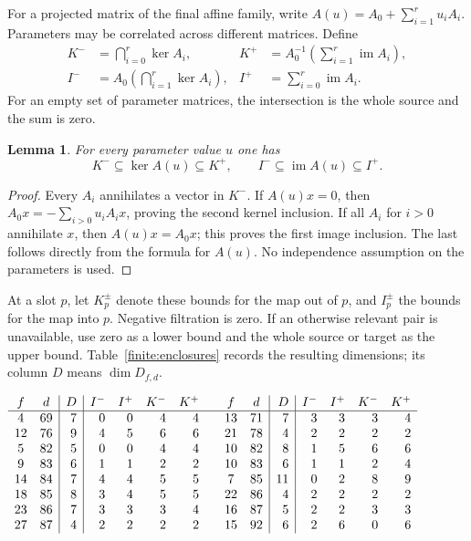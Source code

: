 \documentclass[11pt]{article}
\newtheorem{lemma}[theorem]{Lemma}
\theoremstyle{definition}
\theoremstyle{remark}
\numberwithin{equation}{section}
\begin{document}
For a projected matrix of the final affine family, write
$A(u)=A_0+\sum_{i=1}^r u_iA_i$.  Parameters may be correlated across
different matrices.  Define
\begin{align}
 K^-&=\bigcap_{i=0}^r\ker A_i,&
 K^+&=A_0^{-1}\left(\sum_{i=1}^r\operatorname{im} A_i\right),\label{finite:kernel-bounds}\\
 I^-&=A_0\left(\bigcap_{i=1}^r\ker A_i\right),&
 I^+&=\sum_{i=0}^r\operatorname{im} A_i.\label{finite:image-bounds}
\end{align}
For an empty set of parameter matrices, the intersection is the
whole source and the sum is zero.

\begin{lemma}\label{finite:bounds-valid}
For every parameter value $u$ one has
\[
 K^-\subseteq\ker A(u)\subseteq K^+,
 \qquad I^-\subseteq\operatorname{im} A(u)\subseteq I^+.
\]
\end{lemma}
\begin{proof}
Every $A_i$ annihilates a vector in $K^-$.  If $A(u)x=0$, then
$A_0x=-\sum_{i>0}u_iA_ix$, proving the second kernel inclusion.
If all $A_i$ for $i>0$ annihilate $x$, then $A(u)x=A_0x$;
this proves the first image inclusion.  The last follows directly
from the formula for $A(u)$.  No independence assumption on the
parameters is used.
\end{proof}

At a slot $p$, let $K_p^\pm$ denote these bounds for the map out of
$p$, and $I_p^\pm$ the bounds for the map into $p$.  Negative
filtration is zero.  If an otherwise relevant pair is unavailable,
use zero as a lower bound and the whole source or target as the
upper bound.  Table~\ref{finite:enclosures} records the resulting
dimensions; its column $D$ means $\dim D_{f,d}$.

\begin{table}[htbp]
\small
\(
\begin{array}{cc|r|rrrr@{\qquad}cc|r|rrrr}
 f&d&D&I^-&I^+&K^-&K^+&f&d&D&I^-&I^+&K^-&K^+\\\hline
 4&69&7&0&0&4&4&13&71&7&3&3&3&4\\
 12&76&9&4&5&6&6&21&78&4&2&2&2&2\\
 5&82&5&0&0&4&4&10&82&8&1&5&6&6\\
 9&83&6&1&1&2&2&10&83&6&1&1&2&4\\
 14&84&7&4&4&5&5&7&85&11&0&2&8&9\\
 18&85&8&3&4&5&5&22&86&4&2&2&2&2\\
 23&86&7&3&3&3&4&16&87&5&2&2&3&3\\
 27&87&4&2&2&2&2&15&92&6&2&6&0&6
\end{array}
\)
\caption{Universal lower and upper bounds for images and kernels.}
\label{finite:enclosures}
\end{table}
\end{document}
